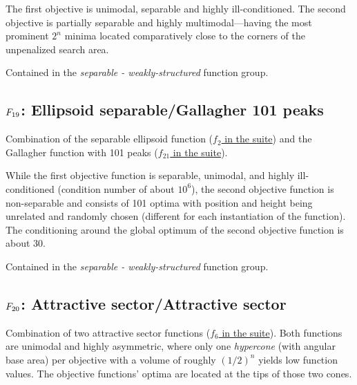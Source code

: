 The first objective is unimodal, separable and highly ill-conditioned.
The second objective is partially separable and highly multimodal---having
the most prominent \(2^n\) minima located comparatively close to the
corners of the unpenalized search area.

Contained in the \emph{separable - weakly-structured} function group.



\subsection[\texorpdfstring{\protect\(F_{19}\protect\): Ellipsoid separable/Gallagher 101 peaks}{F19: Ellipsoid separable/Gallagher 101 peaks}]{\texorpdfstring{\protect\(F_{19}\protect\): Ellipsoid separable/Gallagher 101 peaks}{}}
\label{index:ellipsoid-separable-gallagher-101-peaks}\label{index:f19}
Combination of the separable ellipsoid function (\href{https://coco.gforge.inria.fr/downloads/download16.00/bbobdocfunctions.pdf\#page=10}{\(f_2\) in the \bbob suite}) and the Gallagher function with 101 peaks (\href{https://coco.gforge.inria.fr/downloads/download16.00/bbobdocfunctions.pdf\#page=105}{\(f_{21}\) in the \bbob suite}).

While the first objective function is separable, unimodal, and
highly ill-conditioned (condition number of about \(10^6\)),
the second objective function is non-separable and consists
of 101 optima with position and height being unrelated and
randomly chosen (different for each instantiation of the function).
The conditioning around the global optimum of the second
objective function is about 30.

Contained in the \emph{separable - weakly-structured} function group.



\subsection[\texorpdfstring{\protect\(F_{20}\protect\): Attractive sector/Attractive sector}{F20: Attractive sector/Attractive sector}]{\texorpdfstring{\protect\(F_{20}\protect\): Attractive sector/Attractive sector}{}}
\label{index:f20}\label{index:attractive-sector-attractive-sector}
Combination of two attractive sector functions (\href{https://coco.gforge.inria.fr/downloads/download16.00/bbobdocfunctions.pdf\#page=30}{\(f_6\) in the \bbob suite}).
Both functions are unimodal and highly asymmetric, where only one
\emph{hypercone} (with angular base area) per objective with a volume of
roughly \((1/2)^n\) yields low function values. The objective
functions' optima are located at the tips of those two cones.

